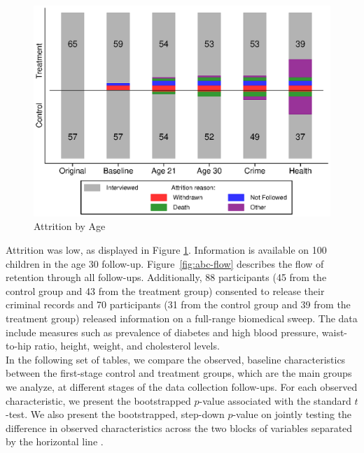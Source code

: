 \begin{appendices}
\begin{figure}[H]
\caption{Attrition by Age} \label{fig:attrition}
    \centering
  \includegraphics[width=.9\columnwidth]{output/abc_attrition.eps}
\end{figure}

\noindent Attrition was low, as displayed in Figure \ref{fig:attrition}. Information is available on 100 children in the age 30 follow-up. Figure~\ref{fig:abc-flow} describes the flow of retention through all follow-ups. Additionally, 88 participants (45 from the control group and 43 from the treatment group) consented to release their criminal records and 70 participants (31 from the control group and 39 from the treatment group) released information on a full-range biomedical sweep. The data include measures such as prevalence of diabetes and high blood pressure, waist-to-hip ratio, height, weight, and cholesterol levels.\\ 

\noindent In the following set of tables, we compare the observed, baseline characteristics between the first-stage control and treatment groups, which are the main groups we analyze, at different stages of the data collection follow-ups. For each observed characteristic, we present the bootstrapped $p$-value associated with the standard $t$-test. We also present the bootstrapped, step-down $p$-value on jointly testing the difference in observed characteristics across the two blocks of variables separated by the horizontal line \citep{Lehmann_Romano_2005_testing}.\\


\end{appendices}
